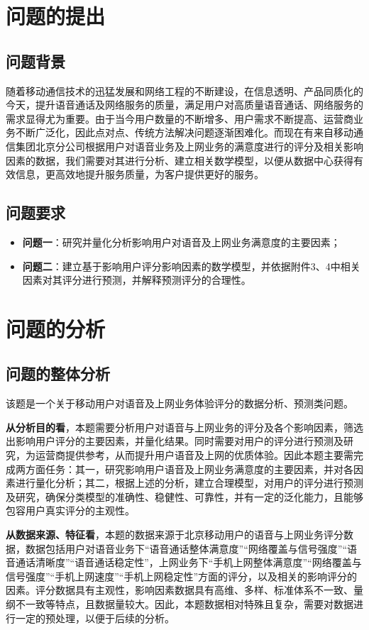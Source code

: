 \documentclass{MathorCupmodeling}
\begin{document}
	\pagestyle{empty}
	\tableofcontents
	\newpage
	\pagestyle{fancy}

	\setcounter{page}{1}
	\section{问题的提出}
	\subsection{问题背景}
	随着移动通信技术的迅猛发展和网络工程的不断建设，在信息透明、产品同质化的今天，提升语音通话及网络服务的质量，满足用户对高质量语音通话、网络服务的需求显得尤为重要。由于当今用户数量的不断增多、用户需求不断提高、运营商业务不断广泛化，因此点对点、传统方法解决问题逐渐困难化。而现在有来自移动通信集团北京分公司根据用户对语音业务及上网业务的满意度进行的评分及相关影响因素的数据，我们需要对其进行分析、建立相关数学模型，以便从数据中心获得有效信息，更高效地提升服务质量，为客户提供更好的服务。
	\subsection{问题要求}
	\begin{itemize}
		\item \textbf{问题一}：研究并量化分析影响用户对语音及上网业务满意度的主要因素；
		\item \textbf{问题二}：建立基于影响用户评分影响因素的数学模型，并依据附件3、4中相关因素对其评分进行预测，并解释预测评分的合理性。
	\end{itemize}
	\section{问题的分析}
	\subsection{问题的整体分析}
	该题是一个关于移动用户对语音及上网业务体验评分的数据分析、预测类问题。

	\textbf{从分析目的看}，本题需要分析用户对语音与上网业务的评分及各个影响因素，筛选出影响用户评分的主要因素，并量化结果。同时需要对用户的评分进行预测及研究，为运营商提供参考，从而提升用户语音及上网的优质体验。因此本题主要需完成两方面任务：{\heiti 其一}，研究影响用户语音及上网业务满意度的主要因素，并对各因素进行量化分析；{\heiti 其二}，根据上述的分析，建立合理模型，对用户的评分进行预测及研究，确保分类模型的准确性、稳健性、可靠性，并有一定的泛化能力，且能够包容用户真实评分的主观性。

	\textbf{从数据来源、特征看}，本题的数据来源于北京移动用户的语音与上网业务评分数据，数据包括用户对语音业务下“语音通话整体满意度”“网络覆盖与信号强度”“语音通话清晰度”“语音通话稳定性”，上网业务下“手机上网整体满意度”“网络覆盖与信号强度”“手机上网速度”“手机上网稳定性”方面的评分，以及相关的影响评分的因素。评分数据具有主观性，影响因素数据具有高维、多样、标准体系不一致、量纲不一致等特点，且数据量较大。因此，本题数据相对特殊且复杂，需要对数据进行一定的预处理，以便于后续的分析。
	
\end{document}
